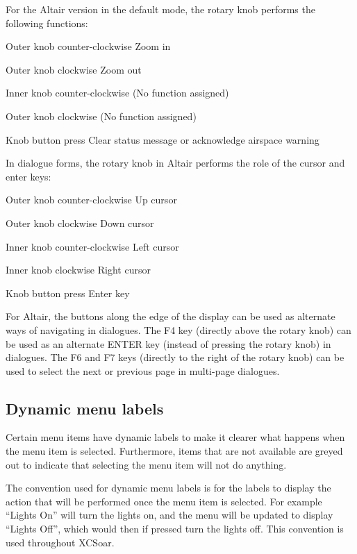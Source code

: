 For the Altair version in the default mode, the rotary knob performs
the following functions:
\begin{jspecs}
\item[Outer knob counter-clockwise] Zoom in
\item[Outer knob clockwise] Zoom out
\item[Inner knob counter-clockwise] (No function assigned)
\item[Outer knob clockwise] (No function assigned)
\item[Knob button press] Clear status message or acknowledge airspace warning
\end{jspecs}

In dialogue forms, the rotary knob in Altair performs the role of the cursor and
enter keys:
\begin{jspecs}
\item[Outer knob counter-clockwise] Up cursor
\item[Outer knob clockwise] Down cursor
\item[Inner knob counter-clockwise] Left cursor
\item[Inner knob clockwise] Right cursor
\item[Knob button press] Enter key
\end{jspecs}

For Altair, the buttons along the edge of the display can be used as
alternate ways of navigating in dialogues.  The F4 key (directly above
the rotary knob) can be used as an alternate ENTER key (instead of
pressing the rotary knob) in dialogues.  The F6 and F7 keys (directly to
the right of the rotary knob) can be used to select the next or
previous page in multi-page dialogues.

\subsection*{Dynamic menu labels}
Certain menu items have dynamic labels to make it clearer what happens when the
menu item is selected.  Furthermore, items that are not available are greyed
out to indicate that selecting the menu item will not do anything.

The convention used for dynamic menu labels is for the labels to display the
action that will be performed once the menu item is selected. For example
``Lights On'' will turn the lights on, and the menu will be updated to display
``Lights Off'', which would then if pressed turn the lights off. This
convention is used throughout XCSoar.


